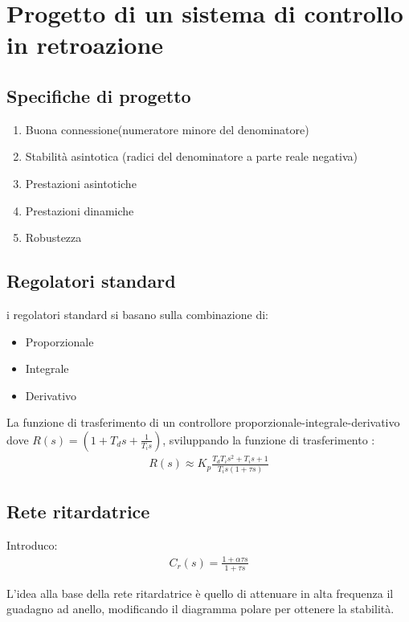 \chapter{Progetto di un sistema di controllo in retroazione}


\section{Specifiche di progetto}
\begin{enumerate}
  \item Buona connessione(numeratore minore del denominatore)
  \item Stabilit\`a asintotica (radici del denominatore a parte reale negativa)
  \item Prestazioni asintotiche
  \item Prestazioni dinamiche
  \item Robustezza
\end{enumerate}



\section{Regolatori standard}
i regolatori standard si basano sulla combinazione di:
\begin{itemize}
  \item Proporzionale
  \item Integrale
  \item Derivativo
\end{itemize}

La funzione di trasferimento di un controllore proporzionale-integrale-derivativo 
dove $R(s) = (1 + T_d s + \frac{1}{T_i s})$, sviluppando la funzione di trasferimento :
\begin{align}
  R(s) \approx K_p \frac{
    T_d T_i s^2 + T_i s + 1
  }{
    T_i s (1 + \tau s)
  }
\end{align}
  

\section{Rete ritardatrice}
Introduco:
\begin{align}
  C_r(s) = \frac{
    1 + \alpha \tau s
  }{
    1 + \tau s
  }
\end{align}


L'idea alla base della rete ritardatrice \`e quello di attenuare in alta frequenza
il guadagno ad anello, modificando il diagramma polare per ottenere la stabilit\`a.


